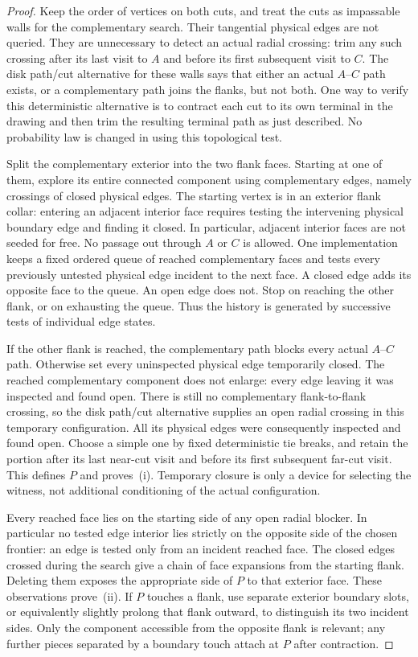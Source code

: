 \begin{proof}
Keep the order of vertices on both cuts, and treat the cuts as
impassable walls for the complementary search.  Their tangential
physical edges are not queried.  They are unnecessary to detect an
actual radial crossing: trim any such crossing after its last visit
to $A$ and before its first subsequent visit to $C$.  The disk
path/cut alternative for these walls says that either an actual
$A$--$C$ path exists, or a complementary path joins the flanks,
but not both.  One way to verify this deterministic alternative is
to contract each cut to its own terminal in the drawing and then
trim the resulting terminal path as just described.  No probability
law is changed in using this topological test.

Split the complementary exterior into the two flank faces.  Starting
at one of them, explore its entire connected component using
complementary edges, namely crossings of closed physical edges.  The
starting vertex is in an exterior flank collar: entering an adjacent
interior face requires testing the intervening physical boundary edge
and finding it closed.  In particular, adjacent interior faces are
not seeded for free.  No passage out through $A$ or $C$ is allowed.
One implementation keeps a
fixed ordered queue of reached complementary faces and tests every
previously untested physical edge incident to the next face.  A closed
edge adds its opposite face to the queue.  An open edge does not.
Stop on reaching the other flank, or on exhausting the queue.  Thus the
history is generated by successive tests of individual edge states.

If the other flank is reached, the complementary path blocks every
actual $A$--$C$ path.  Otherwise set every uninspected physical edge
temporarily closed.  The reached complementary component does not
enlarge: every edge leaving it was inspected and found open.  There
is still no complementary flank-to-flank crossing, so the disk
path/cut alternative supplies an open radial crossing in this
temporary configuration.  All its physical edges were consequently
inspected and found open.  Choose a simple one by fixed deterministic
tie breaks, and retain the portion after its last near-cut visit and
before its first subsequent far-cut visit.  This defines $P$ and
proves~\textup{(i)}.  Temporary closure is only a device for selecting
the witness, not additional conditioning of the actual configuration.

Every reached face lies on the starting side of any open radial
blocker.  In particular no tested edge interior lies strictly on the
opposite side of the chosen frontier: an edge is tested only from an
incident reached face.  The closed edges crossed during the search
give a chain of face expansions from the starting flank.  Deleting
them exposes the appropriate side of $P$ to that exterior face.
These observations prove~\textup{(ii)}.  If $P$ touches a flank, use
separate exterior boundary slots, or equivalently slightly prolong
that flank outward, to distinguish its two incident sides.  Only the
component accessible from the opposite flank is relevant; any further
pieces separated by a boundary touch attach at $P$ after contraction.


\end{proof}

